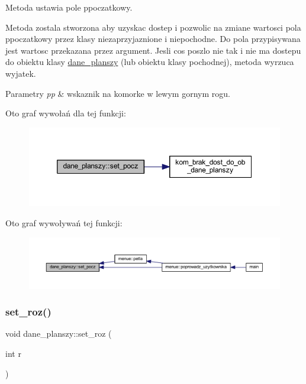 Metoda ustawia pole ppoczatkowy.

Metoda zostala stworzona aby uzyskac dostep i pozwolic na zmiane wartosci pola ppoczatkowy przez klasy niezaprzyjaznione i niepochodne. Do pola przypisywana jest wartosc przekazana przez argument. Jesli cos poszlo nie tak i nie ma dostepu do obiektu klasy \mbox{\hyperlink{classdane__planszy}{dane\+\_\+planszy}} (lub obiektu klasy pochodnej), metoda wyrzuca wyjatek. 
\begin{DoxyParams}{Parametry}
{\em pp} & wskaznik na komorke w lewym gornym rogu. \\
\hline
\end{DoxyParams}
Oto graf wywołań dla tej funkcji\+:
\nopagebreak
\begin{figure}[H]
\begin{center}
\leavevmode
\includegraphics[width=350pt]{classdane__planszy_abd328051f43a94315eccb2a80fcb4593_cgraph}
\end{center}
\end{figure}
Oto graf wywoływań tej funkcji\+:
\nopagebreak
\begin{figure}[H]
\begin{center}
\leavevmode
\includegraphics[width=350pt]{classdane__planszy_abd328051f43a94315eccb2a80fcb4593_icgraph}
\end{center}
\end{figure}
\mbox{\label{classdane__planszy_a9516490206327f9bd83eeffc6c8180bb}} 
\subsubsection{\texorpdfstring{set\+\_\+roz()}{set\_roz()}}
{\footnotesize\ttfamily void dane\+\_\+planszy\+::set\+\_\+roz (\begin{DoxyParamCaption}\item[{int}]{r }\end{DoxyParamCaption})}

